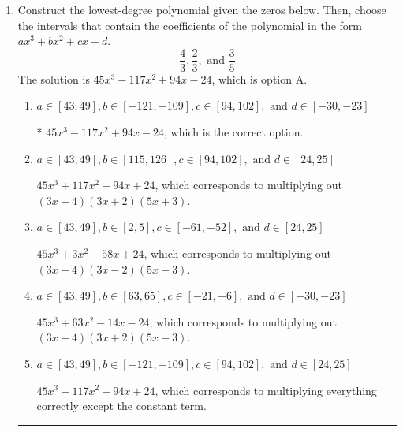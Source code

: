 \documentclass{extbook}[14pt]
\newcommand{\litem}[1]{\item #1

\rule{\textwidth}{0.4pt}}
\begin{document}
\begin{enumerate}\litem{
Construct the lowest-degree polynomial given the zeros below. Then, choose the intervals that contain the coefficients of the polynomial in the form $ax^3+bx^2+cx+d$.
\[ \frac{4}{3}, \frac{2}{3}, \text{ and } \frac{3}{5} \]The solution is \( 45x^{3} -117 x^{2} +94 x -24 \), which is option A.\begin{enumerate}[label=\Alph*.]
\item \( a \in [43, 49], b \in [-121, -109], c \in [94, 102], \text{ and } d \in [-30, -23] \)

* $45x^{3} -117 x^{2} +94 x -24$, which is the correct option.
\item \( a \in [43, 49], b \in [115, 126], c \in [94, 102], \text{ and } d \in [24, 25] \)

$45x^{3} +117 x^{2} +94 x + 24$, which corresponds to multiplying out $(3x + 4)(3x + 2)(5x + 3)$.
\item \( a \in [43, 49], b \in [2, 5], c \in [-61, -52], \text{ and } d \in [24, 25] \)

$45x^{3} +3 x^{2} -58 x + 24$, which corresponds to multiplying out $(3x + 4)(3x -2)(5x -3)$.
\item \( a \in [43, 49], b \in [63, 65], c \in [-21, -6], \text{ and } d \in [-30, -23] \)

$45x^{3} +63 x^{2} -14 x -24$, which corresponds to multiplying out $(3x + 4)(3x + 2)(5x -3)$.
\item \( a \in [43, 49], b \in [-121, -109], c \in [94, 102], \text{ and } d \in [24, 25] \)

$45x^{3} -117 x^{2} +94 x + 24$, which corresponds to multiplying everything correctly except the constant term.
\end{enumerate}

}
\end{enumerate}
\end{document}
